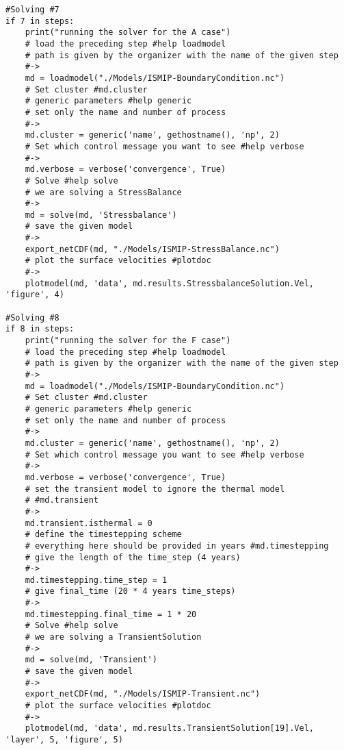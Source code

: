 \begin{lstlisting}
#Solving #7
if 7 in steps:
    print("running the solver for the A case")
    # load the preceding step #help loadmodel
    # path is given by the organizer with the name of the given step
    #->
    md = loadmodel("./Models/ISMIP-BoundaryCondition.nc")
    # Set cluster #md.cluster
    # generic parameters #help generic
    # set only the name and number of process
    #->
    md.cluster = generic('name', gethostname(), 'np', 2)
    # Set which control message you want to see #help verbose
    #->
    md.verbose = verbose('convergence', True)
    # Solve #help solve
    # we are solving a StressBalance
    #->
    md = solve(md, 'Stressbalance')
    # save the given model
    #->
    export_netCDF(md, "./Models/ISMIP-StressBalance.nc")
    # plot the surface velocities #plotdoc
    #->
    plotmodel(md, 'data', md.results.StressbalanceSolution.Vel, 'figure', 4)

#Solving #8
if 8 in steps:
    print("running the solver for the F case")
    # load the preceding step #help loadmodel
    # path is given by the organizer with the name of the given step
    #->
    md = loadmodel("./Models/ISMIP-BoundaryCondition.nc")
    # Set cluster #md.cluster
    # generic parameters #help generic
    # set only the name and number of process
    #->
    md.cluster = generic('name', gethostname(), 'np', 2)
    # Set which control message you want to see #help verbose
    #->
    md.verbose = verbose('convergence', True)
    # set the transient model to ignore the thermal model
    # #md.transient
    #->
    md.transient.isthermal = 0
    # define the timestepping scheme
    # everything here should be provided in years #md.timestepping
    # give the length of the time_step (4 years)
    #->
    md.timestepping.time_step = 1
    # give final_time (20 * 4 years time_steps)
    #->
    md.timestepping.final_time = 1 * 20
    # Solve #help solve
    # we are solving a TransientSolution
    #->
    md = solve(md, 'Transient')
    # save the given model
    #->
    export_netCDF(md, "./Models/ISMIP-Transient.nc")
    # plot the surface velocities #plotdoc
    #->
    plotmodel(md, 'data', md.results.TransientSolution[19].Vel, 'layer', 5, 'figure', 5)
\end{lstlisting}
